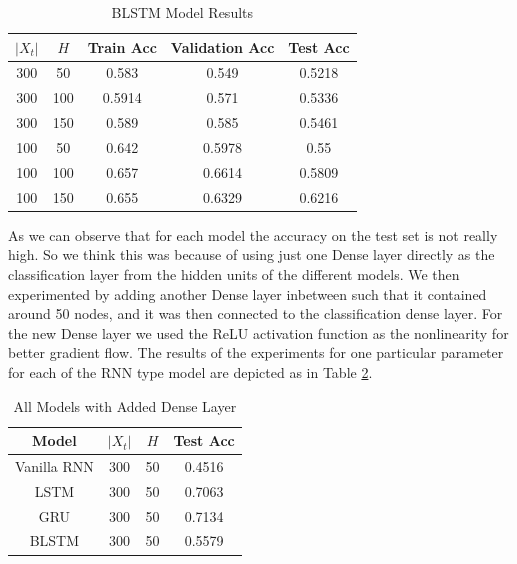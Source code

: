 \documentclass[letterpaper, 12 pt, conference]{ieeeconf}  %
\begin{document}
\begin{table}[!h]
\centering
\caption{BLSTM Model Results}
\begin{tabular}{| c || c || c || c || c |} %
\hline %
 $|X_t|$ & $H$ & Train Acc & Validation Acc & Test Acc\\
   \hline \hline
300 & 50 & 0.583 & 0.549 & 0.5218 \\
\hline
300 & 100 & 0.5914 & 0.571 & 0.5336 \\
\hline
300 & 150 & 0.589 & 0.585 & 0.5461 \\	
\hline
100 & 50 & 0.642 & 0.5978 & 0.55 \\
\hline
100 & 100 & 0.657 & 0.6614 & 0.5809 \\
\hline
100 & 150 & 0.655 & 0.6329 & 0.6216 \\
\hline
   \end{tabular}
\label{tab:BLSTM_Acc} 
\end{table}


As we can observe that for each model the accuracy on the test set is not really high. So we think this was because of using just one Dense layer directly as the classification layer from the hidden units of the different models. We then experimented by adding another Dense layer inbetween such that it contained around 50 nodes, and it was then connected to the classification dense layer. For the new Dense layer we used the ReLU activation function as the nonlinearity for better gradient flow. The results of the experiments for one particular parameter for each of the RNN type model are depicted as in Table \ref{tab:2Dense}.

\begin{table}[!h]
\centering
\caption{All Models with Added Dense Layer}
\begin{tabular}{| c || c || c || c |} %
\hline %
Model & $|X_t|$ & $H$ & Test Acc\\
   \hline \hline
Vanilla RNN & 300 & 50 & 0.4516\\
\hline
LSTM & 300 & 50 & 0.7063\\
\hline
GRU & 300 & 50 & 0.7134\\	
\hline
BLSTM & 300 & 50 & 0.5579  \\
\hline
   \end{tabular}
\label{tab:2Dense} 
\end{table}
\end{document}
